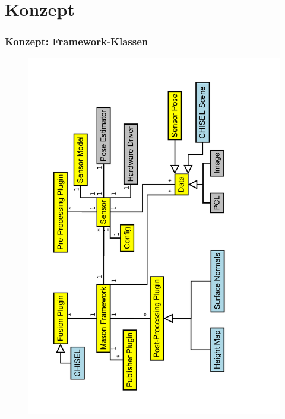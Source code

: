 \section{Konzept} 

\begin{frame}[c]
    \frametitle{Konzept: Framework-Klassen}
      
    \begin{figure}[t]
      \vspace{-0.8cm}
      \includegraphics[angle=270,origin=c, width= \textwidth]{diagrams/framework_concept.pdf}
      \label{fig:preprocessing_phase}
    \end{figure}
 
    \end{frame}


